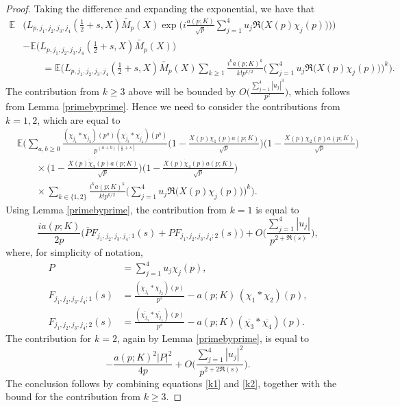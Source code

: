 \documentclass[12pt, reqno]{amsart}
\newcommand{\E}{\mathbb{E}}
\numberwithin{equation}{section}
\numberwithin{theorem}{section}
\numberwithin{equation}{section}
\begin{document}
\begin{proof}
    Taking the difference and expanding the exponential, we have that
    \begin{align*}
 \E & \Bigg(L_{p,j_1,j_2,j_3,j_4}( \tfrac{1}{2}+s,X) \widetilde{M_p}(X) \exp \bigg(  i \frac{a(p;K)}{
    \sqrt{p}}\sum_{j=1}^4   u_j \Re \big(X(p) \chi_j(p)\big)\bigg) \Bigg) \\
    & -  \E \Bigg(L_{p,j_1,j_2,j_3,j_4}( \tfrac{1}{2}+s,X) \widetilde{M_p}(X) \Bigg)\\
    &\qquad = \E \Bigg( L_{p,j_1,j_2,j_3,j_4}( \tfrac{1}{2}+s,X) \widetilde{M_p}(X) \sum_{k \geq 1} \frac{i^k a(p;K)^k}{k! p^{k/2}}\bigg( \sum_{j=1}^4 u_j \Re \big(X(p) \chi_j(p)\big) \bigg)^k \Bigg).
    \end{align*}
    The contribution from $k \geq 3$ above will be bounded by $O \big( \frac{\sum_{j=1}^4 |u_j|^3}{p^{2}}\big)$, which follows from Lemma \ref{primebyprime}. Hence we need to consider the contributions from $k=1,2$, which are equal to 
    \begin{align*}
&\E \Bigg( \sum_{a,b \geq 0} \frac{ (\chi_{j_1} * \chi_{j_2})(p^{a}) (\overline{\chi_{j_3}} * \overline{\chi_{j_4}})(p^{b})}{p^{(a+b)(\frac{1}{2}+s)}}  \Big(1 - \frac{X(p) \chi_1(p) a(p;K)}{\sqrt{p}} \Big)\Big(1 - \frac{X(p) \chi_2(p) a(p;K)}{\sqrt{p}} \Big) \\
&\qquad \times \Big(1 - \frac{\overline{X(p) \chi_3(p)} a(p;K)}{\sqrt{p}} \Big)  \Big(1 - \frac{ \overline{X(p) \chi_4(p)} a(p;K)}{\sqrt{p}} \Big)\\
&\qquad\times\sum_{k  \in \{1,2\}} \frac{i^k a(p;K)^k}{k! p^{k/2}} \bigg( \sum_{j=1}^4 u_j \Re \big(X(p) \chi_j(p)\big) \bigg)^k \Bigg).
\end{align*}
Using Lemma \ref{primebyprime}, the contribution from $k=1$ is equal to 
\begin{equation}
\label{k1}\frac{ia(p;K)}{2p} \big(\overline{P}F_{j_1,j_2,j_3,j_4;1}(s)+P F_{j_1,j_2,j_3,j_4;2}(s)\big)+ O \Big(  \frac{\sum_{j=1}^4 |u_j|}{p^{2+\Re(s)}}\Big),
\end{equation}
where, for simplicity of notation,
\begin{align*}
    P& = \sum_{j=1}^4 u_j \chi_j(p),\\
F_{j_1,j_2,j_3,j_4;1}(s)&= \frac{(\chi_{j_1}*\chi_{j_2})(p)}{p^{s}} - a(p;K)\,(\chi_1*\chi_2)(p),\\
 F_{j_1,j_2,j_3,j_4;2}(s)&=  \frac{(\overline{\chi_{j_3}}*\overline{\chi_{j_4}})(p)}{p^{s}} - a(p;K)(\overline{\chi_3}*\overline{\chi_4})(p).
 \end{align*}
The contribution for $k=2$, again by Lemma \ref{primebyprime}, is equal to
\begin{equation} 
\label{k2}
- \frac{a(p;K)^2 |P|^2}{4p} + O\Big(  \frac{ \sum_{j=1}^4 |u_j|^2}{p^{2+2\Re(s)}}\Big).
\end{equation}
 The conclusion follows by combining equations \eqref{k1} and \eqref{k2}, together with the bound for the contribution from $k \geq 3$.    
  \end{proof}
\end{document}
